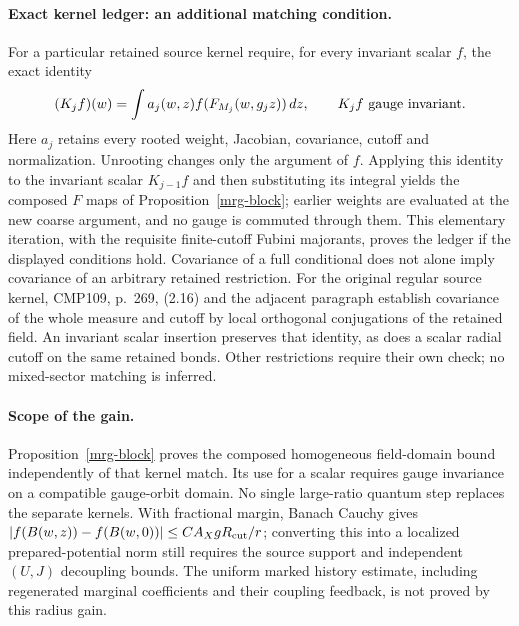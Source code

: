 \paragraph{Exact kernel ledger: an additional matching condition.}
For a particular retained source kernel require, for every invariant
scalar $f$, the exact identity
\[
 (K_jf)(w)=\int a_j(w,z)f(F_{M_j}(w,g_jz))\,dz,
 \qquad K_jf\ \hbox{gauge invariant}.
\]
Here $a_j$ retains every rooted weight, Jacobian, covariance, cutoff
and normalization. Unrooting changes only the argument of $f$.
Applying this identity to the invariant scalar $K_{j-1}f$ and then
substituting its integral yields the composed $F$ maps of
Proposition~\ref{mrg-block}; earlier weights are evaluated at the new
coarse argument, and no gauge is commuted through them. This elementary
iteration, with the requisite finite-cutoff Fubini majorants, proves
the ledger if the displayed conditions hold. Covariance of a full
conditional does not alone imply covariance of an arbitrary retained
restriction. For the original regular source kernel, CMP109, p.~269,
(2.16) and the adjacent paragraph establish covariance of the whole
measure and cutoff by local orthogonal conjugations of the retained
field. An invariant scalar insertion preserves that identity, as does
a scalar radial cutoff on the same retained bonds. Other restrictions
require their own check; no mixed-sector matching is inferred.

\paragraph{Scope of the gain.}
Proposition~\ref{mrg-block} proves the composed homogeneous field-domain
bound independently of that kernel match. Its use for a scalar requires
gauge invariance on a compatible gauge-orbit domain. No single
large-ratio quantum step replaces the separate kernels.
With fractional margin, Banach Cauchy gives
$|f(B(w,z))-f(B(w,0))|\le C A_XgR_{\rm cut}/r$; converting this
into a localized prepared-potential norm still requires the source
support and independent $(U,J)$ decoupling bounds. The uniform marked
history estimate, including regenerated marginal coefficients and their
coupling feedback, is not proved by this radius gain.
